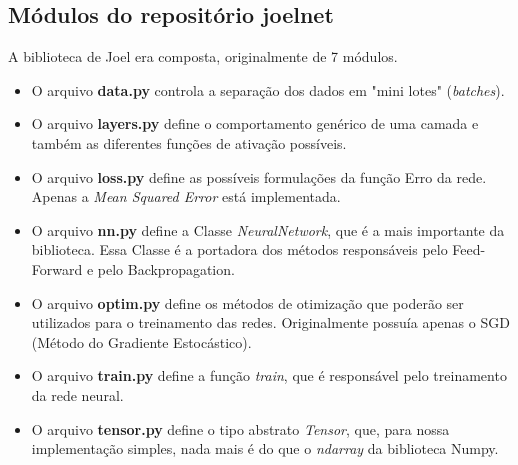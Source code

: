 \documentclass[11pt]{article}
\begin{document}
\subsection*{Módulos do repositório joelnet}
A biblioteca de Joel era composta, originalmente de 7 módulos.
\begin{itemize}
\item O arquivo \textbf{data.py} controla a separação dos dados em "mini lotes" (\textit{batches}).

\item O arquivo \textbf{layers.py} define o comportamento genérico de uma camada e também as diferentes funções de ativação possíveis.

\item O arquivo \textbf{loss.py} define as possíveis formulações da função Erro da rede. Apenas a \textit{Mean Squared Error} está implementada.

\item O arquivo \textbf{nn.py} define a Classe \textit{NeuralNetwork}, que é a mais importante da biblioteca. Essa Classe é a portadora dos métodos responsáveis pelo Feed-Forward e pelo Backpropagation.

\item O arquivo \textbf{optim.py} define os métodos de otimização que poderão ser utilizados para o treinamento das redes. Originalmente possuía apenas o SGD (Método do Gradiente Estocástico).
\item  O arquivo \textbf{train.py} define a função \textit{train}, que é responsável pelo treinamento da rede neural.

\item O arquivo \textbf{tensor.py} define o tipo abstrato \textit{Tensor}, que, para nossa implementação simples, nada mais é do que o \textit{ndarray} da biblioteca Numpy.
\end{itemize}
\end{document}
